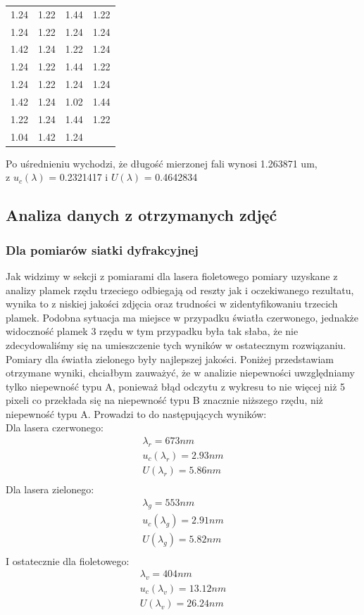 \documentclass{article}
\begin{document}
\begin{table}[h!]
\centering
\begin{tabular}{|l|l|l|l|}
\hline
1.24 & 1.22 & 1.44 & 1.22 \\
1.24 & 1.22 & 1.24 & 1.24 \\
1.42 & 1.24 & 1.22 & 1.24 \\
1.24 & 1.22 & 1.44 & 1.22 \\
1.24 & 1.22 & 1.24 & 1.24 \\
1.42 & 1.24 & 1.02 & 1.44 \\
1.22 & 1.24 & 1.44 & 1.22 \\
1.04 & 1.42 & 1.24 &     \\
\hline
\end{tabular}
\end{table}
Po uśrednieniu wychodzi, że długość mierzonej fali wynosi 1.263871 um, \\
z $u_{c}(\lambda)$ = 0.2321417 i $U(\lambda)$ = 0.4642834

\subsection{Analiza danych z otrzymanych zdjęć}
\subsubsection{Dla pomiarów siatki dyfrakcyjnej}
Jak widzimy w sekcji z pomiarami dla lasera fioletowego pomiary uzyskane z analizy plamek rzędu trzeciego odbiegają od reszty jak i oczekiwanego rezultatu, wynika to z niskiej jakości zdjęcia oraz trudności w zidentyfikowaniu trzecich plamek. Podobna sytuacja ma miejsce w przypadku światła czerwonego, jednakże widoczność plamek 3 rzędu  w tym przypadku była tak słaba, że nie zdecydowaliśmy się na umieszczenie tych wyników w ostatecznym rozwiązaniu. Pomiary dla światła zielonego były najlepszej jakości. Poniżej przedstawiam otrzymane wyniki, chciałbym zauważyć, że w analizie niepewności uwzględniamy tylko niepewność typu A, ponieważ błąd odczytu z wykresu to nie więcej niż 5 pixeli co przekłada się na niepewność typu B znacznie niższego rzędu, niż niepewność typu A. Prowadzi to do następujących wyników:\\
Dla lasera czerwonego:
\begin{gather*}
    \lambda_r=673nm\\
    u_c(\lambda_r)=2.93nm\\
    U(\lambda_r)=5.86nm\\
\end{gather*}
Dla lasera zielonego:
\begin{gather*}
    \lambda_g=553nm\\
    u_c(\lambda_g)=2.91nm\\
    U(\lambda_g)=5.82nm\\
\end{gather*}
I ostatecznie dla fioletowego:
\begin{gather*}
    \lambda_v=404nm\\
    u_c(\lambda_v)=13.12nm\\
    U(\lambda_v)=26.24nm\\
\end{gather*}
\end{document}
